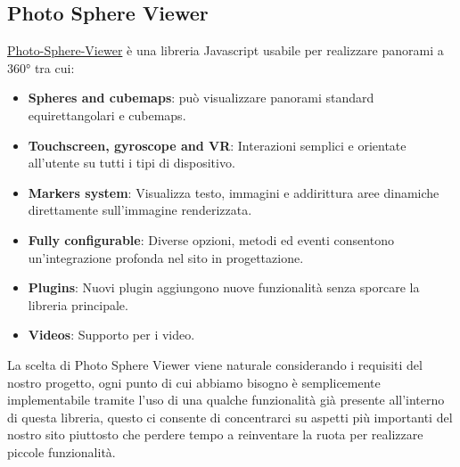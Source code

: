 \documentclass{article}
\newcommand{\photosphereviewer}{\href{https://photo-sphere-viewer.js.org/}{Photo-Sphere-Viewer} }
\begin{document}
\subsection{Photo Sphere Viewer}
\photosphereviewer è una libreria Javascript usabile per realizzare panorami a 360° tra cui:
\begin{itemize}
	\item \textbf{Spheres and cubemaps}: può visualizzare panorami standard equirettangolari e cubemaps.
	\item \textbf{Touchscreen, gyroscope and VR}: Interazioni semplici e orientate all'utente su tutti i tipi di dispositivo.
	\item \textbf{Markers system}: Visualizza testo, immagini e addirittura aree dinamiche direttamente sull'immagine renderizzata.
	\item \textbf{Fully configurable}: Diverse opzioni, metodi ed eventi consentono un'integrazione profonda nel sito in progettazione.
	\item \textbf{Plugins}: Nuovi plugin aggiungono nuove funzionalità senza sporcare la libreria principale.
	\item \textbf{Videos}: Supporto per i video.
\end{itemize}
La scelta di Photo Sphere Viewer viene naturale considerando i requisiti del nostro progetto, ogni punto di cui abbiamo bisogno è semplicemente implementabile tramite l'uso di una qualche funzionalità già presente all'interno di questa libreria, questo ci consente di concentrarci su aspetti più importanti del nostro sito piuttosto che perdere tempo a reinventare la ruota per realizzare piccole funzionalità.
\end{document}
